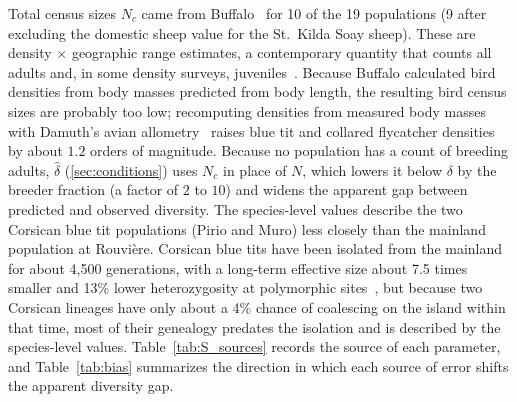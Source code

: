 \documentclass{article}
\begin{document}
Total census sizes $N_c$ came from Buffalo~\cite{buffalo2021} for 10 of the 19 populations (9 after excluding the domestic sheep value for the St.~Kilda Soay sheep). These are density $\times$ geographic range estimates, a contemporary quantity that counts all adults and, in some density surveys, juveniles~\cite{lewin2026}. Because Buffalo calculated bird densities from body masses predicted from body length, the resulting bird census sizes are probably too low; recomputing densities from measured body masses~\cite{myhrvold2015} with Damuth's avian allometry~\cite{damuth1987} raises blue tit and collared flycatcher densities by about $1.2$ orders of magnitude. Because no population has a count of breeding adults, $\hat{\delta}$ (\autoref{sec:conditions}) uses $N_c$ in place of $N$, which lowers it below $\delta$ by the breeder fraction (a factor of $2$ to $10$) and widens the apparent gap between predicted and observed diversity. The species-level values describe the two Corsican blue tit populations (Pirio and Muro) less closely than the mainland population at Rouvière. Corsican blue tits have been isolated from the mainland for about 4,500 generations, with a long-term effective size about 7.5 times smaller and 13\% lower heterozygosity at polymorphic sites~\cite{perrier2020}, but because two Corsican lineages have only about a 4\% chance of coalescing on the island within that time, most of their genealogy predates the isolation and is described by the species-level values. Table~\ref{tab:S_sources} records the source of each parameter, and Table~\ref{tab:bias} summarizes the direction in which each source of error shifts the apparent diversity gap.
\end{document}
